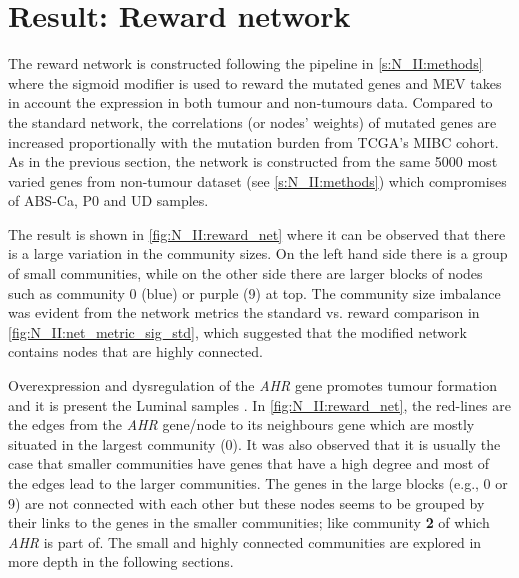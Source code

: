 \section{Result: Reward network} \label{s:N_II:rwd}

\vspace{3mm}
\vspace{3mm}

The reward network is constructed following the pipeline in \cref{s:N_II:methods} where the sigmoid modifier is used to reward the mutated genes and MEV takes in account the expression in both tumour and non-tumours data. Compared to the standard network, the correlations (or nodes' weights) of mutated genes are increased proportionally with the mutation burden from TCGA's MIBC cohort. As in the previous section, the network is constructed from the same 5000 most varied genes from non-tumour dataset (see \cref{s:N_II:methods}) which compromises of ABS-Ca, P0 and UD samples.

The result is shown in \cref{fig:N_II:reward_net} where it can be observed that there  is a large variation in the community sizes. On the left hand side there is a group of small communities, while on the other side there are larger blocks of nodes such as community 0 (blue) or purple (9) at top. The community size imbalance was evident from the network metrics the standard vs. reward comparison in \cref{fig:N_II:net_metric_sig_std}, which suggested that the modified network contains nodes that are highly connected.

Overexpression and dysregulation of the \textit{AHR} gene promotes tumour formation and it is present the Luminal samples \citep{Shi2020-km}. In \cref{fig:N_II:reward_net}, the red-lines are the edges from the \textit{AHR} gene/node to its neighbours gene which are mostly situated in the largest community (0).  It was also observed that it is usually the case that smaller communities have genes that have a high degree and most of the edges lead to the larger communities. The genes in the large blocks (e.g., 0 or 9) are not connected with each other but these nodes seems to be grouped by their links to the genes in the smaller communities; like community \textbf{2} of which \textit{AHR} is part of. The small and highly connected communities are explored in more depth in the following sections.

